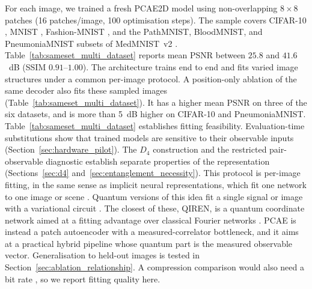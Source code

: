 \documentclass[pdflatex,sn-basic]{sn-jnl}
\begin{document}
For each image, we trained a fresh PCAE2D model using non-overlapping $8\times8$ patches (16 patches/image, 100 optimisation steps).
The sample covers CIFAR-10 \citep{Krizhevsky2009}, MNIST \citep{LeCun1998}, Fashion-MNIST \citep{Xiao2017}, and the PathMNIST, BloodMNIST, and PneumoniaMNIST subsets of MedMNIST~v2 \citep{Yang2023}.
Table~\ref{tab:sameset_multi_dataset} reports mean PSNR between $25.8$ and $41.6$~dB (SSIM $0.91$--$1.00$).
The architecture trains end to end and fits varied image structures under a common per-image protocol.
A position-only ablation of the same decoder also fits these sampled images (Table~\ref{tab:sameset_multi_dataset}).
It has a higher mean PSNR on three of the six datasets, and is more than 5~dB higher on CIFAR-10 and PneumoniaMNIST.
Table~\ref{tab:sameset_multi_dataset} establishes fitting feasibility.
Evaluation-time substitutions show that trained models are sensitive to their observable inputs (Section~\ref{sec:hardware_pilot}).
The $D_4$ construction and the restricted pair-observable diagnostic establish separate properties of the representation (Sections~\ref{sec:d4} and~\ref{sec:entanglement_necessity}).
This protocol is per-image fitting, in the same sense as implicit neural representations, which fit one network to one image or scene \citep{Ulyanov2020DIP, Sitzmann2020, Tancik2020, Mildenhall2020NeRF, Dupont2021COIN, Strumpler2022}.
Quantum versions of this idea fit a single signal or image with a variational circuit \citep{Zhao2024QIREN, Fujihashi2024QINC, LizzioBosco2026QISR}.
The closest of these, QIREN, is a quantum coordinate network aimed at a fitting advantage over classical Fourier networks \citep{Zhao2024QIREN}.
PCAE is instead a patch autoencoder with a measured-correlator bottleneck, and it aims at a practical hybrid pipeline whose quantum part is the measured observable vector.
Generalisation to held-out images is tested in Section~\ref{sec:ablation_relationship}.
A compression comparison would also need a bit rate \citep{Dupont2021COIN, Strumpler2022}, so we report fitting quality here.
\end{document}
